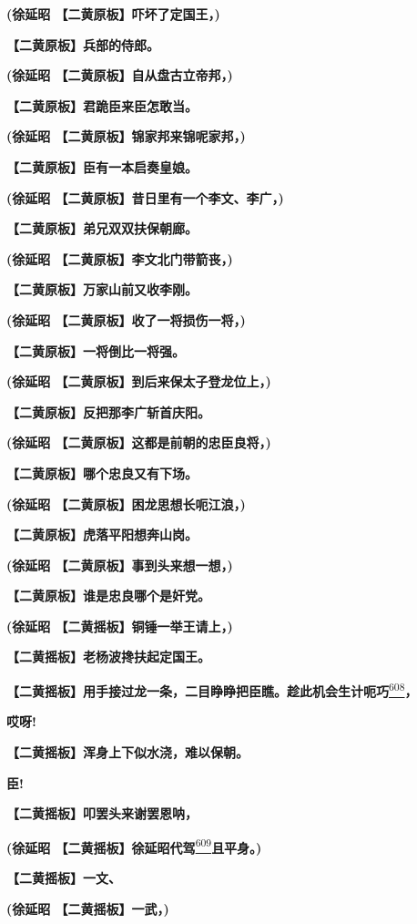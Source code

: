 \textbf{(徐延昭 【二黄原板】吓坏了定国王，)}

\textbf{【二黄原板】兵部的侍郎。}

\textbf{(徐延昭 【二黄原板】自从盘古立帝邦，)}

\textbf{【二黄原板】君跪臣来臣怎敢当。}

\textbf{(徐延昭 【二黄原板】锦家邦来锦呢家邦，)}

\textbf{【二黄原板】臣有一本启奏皇娘。}

\textbf{(徐延昭 【二黄原板】昔日里有一个李文、李广，)}

\textbf{【二黄原板】弟兄双双扶保朝廊。}

\textbf{(徐延昭 【二黄原板】李文北门带箭丧，)}

\textbf{【二黄原板】万家山前又收李刚。}

\textbf{(徐延昭 【二黄原板】收了一将损伤一将，)}

\textbf{【二黄原板】一将倒比一将强。}

\textbf{(徐延昭 【二黄原板】到后来保太子登龙位上，)}

\textbf{【二黄原板】反把那李广斩首庆阳。}

\textbf{(徐延昭 【二黄原板】这都是前朝的忠臣良将，)}

\textbf{【二黄原板】哪个忠良又有下场。}

\textbf{(徐延昭 【二黄原板】困龙思想长呃江浪，)}

\textbf{【二黄原板】虎落平阳想奔山岗。}

\textbf{(徐延昭 【二黄原板】事到头来想一想，)}

\textbf{【二黄原板】谁是忠良哪个是奸党。}

\textbf{(徐延昭 【二黄摇板】铜锤一举王请上，)}

\textbf{【二黄摇板】老杨波搀扶起定国王。}

\textbf{【二黄摇板】用手接过龙一条，二目睁睁把臣瞧。趁此机会生计呃巧}\protect\hyperlink{fn608}{\textsuperscript{608}}\textbf{，}

\textbf{哎呀!}

\textbf{【二黄摇板】浑身上下似水浇，难以保朝。}

\textbf{臣!}

\textbf{【二黄摇板】叩罢头来谢罢恩呐，}

\textbf{(徐延昭
【二黄摇板】徐延昭代驾}\protect\hyperlink{fn609}{\textsuperscript{609}}\textbf{且平身。)}

\textbf{【二黄摇板】一文、}

\textbf{(徐延昭 【二黄摇板】一武，)}

